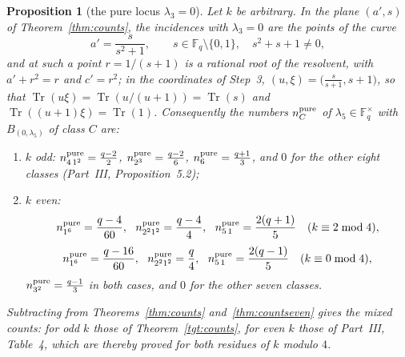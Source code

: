 \documentclass[12pt,a4paper]{amsart}
\newtheorem{proposition}[theorem]{Proposition}
\theoremstyle{definition}
\newcommand{\F}{\mathbb{F}}
\newcommand{\Tr}{\operatorname{Tr}}
\begin{document}
\begin{proposition}[the pure locus $\lambda_3=0$]\label{prop:pure}
Let $k$ be arbitrary. In the plane $(a',s)$ of Theorem~\ref{thm:counts}, the incidences with $\lambda_3=0$ are the points of the curve
\[
a'=\frac{s}{s^2+1},\qquad s\in\F_q\setminus\{0,1\},\quad s^2+s+1\ne0 ,
\]
and at such a point $r=1/(s+1)$ is a rational root of the resolvent, with $a'+r^2=r$ and $c'=r^2$; in the coordinates of Step~3, $(u,\xi)=\bigl(\tfrac s{s+1},s+1\bigr)$, so that $\Tr(u\xi)=\Tr(u/(u+1))=\Tr(s)$ and $\Tr((u+1)\xi)=\Tr(1)$. Consequently the numbers $n^{\rm pure}_C$ of $\lambda_5\in\F_q^\times$ with $B_{(0,\lambda_5)}$ of class $C$ are:
\begin{enumerate}[label=\textup{(\roman*)},leftmargin=2em]
\item $k$ odd: $n^{\rm pure}_{4\,1^2}=\frac{q-2}2$, $n^{\rm pure}_{2^3}=\frac{q-2}6$, $n^{\rm pure}_{6}=\frac{q+1}3$, and $0$ for the other eight classes \textup{(}Part~III, Proposition~5.2\textup{)};
\item $k$ even:
\[
n^{\rm pure}_{1^6}=\frac{q-4}{60},\ \ n^{\rm pure}_{2^21^2}=\frac{q-4}4,\ \ n^{\rm pure}_{5\,1}=\frac{2(q+1)}5\quad(k\equiv2\bmod4),
\]
\[
n^{\rm pure}_{1^6}=\frac{q-16}{60},\ \ n^{\rm pure}_{2^21^2}=\frac q4,\ \ n^{\rm pure}_{5\,1}=\frac{2(q-1)}5\quad(k\equiv0\bmod4),
\]
$n^{\rm pure}_{3^2}=\frac{q-1}3$ in both cases, and $0$ for the other seven classes.
\end{enumerate}
Subtracting from Theorems~\ref{thm:counts} and~\ref{thm:countseven} gives the mixed counts: for odd $k$ those of Theorem~\ref{tgt:counts}, for even $k$ those of Part~III, Table~4, which are thereby proved for both residues of $k$ modulo $4$.
\end{proposition}
\end{document}
